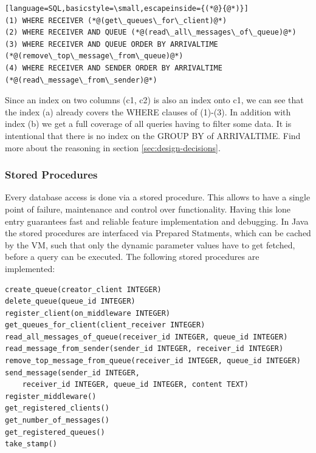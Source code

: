 \documentclass[11pt]{article}
\begin{document}
\begin{lstlisting}[language=SQL,basicstyle=\small,escapeinside={(*@}{@*)}]
(1) WHERE RECEIVER (*@(get\_queues\_for\_client)@*)
(2) WHERE RECEIVER AND QUEUE (*@(read\_all\_messages\_of\_queue)@*)
(3) WHERE RECEIVER AND QUEUE ORDER BY ARRIVALTIME (*@(remove\_top\_message\_from\_queue)@*)
(4) WHERE RECEIVER AND SENDER ORDER BY ARRIVALTIME (*@(read\_message\_from\_sender)@*)
\end{lstlisting}
Since an index on two columns (c1, c2) is also an index onto c1, we can see that the index (a) already covers the WHERE clauses of (1)-(3). In addition with index (b) we get a full coverage of all queries having to filter some data. It is intentional that there is no index on the GROUP BY of ARRIVALTIME. Find more about the reasoning in section \ref{sec:design-decisions}.

\subsubsection{Stored Procedures}\label{sec:stored-procedures}
Every database access is done via a stored procedure. This allows to have a single point of failure, maintenance and control over functionality. Having this lone entry guarantees fast and reliable feature implementation and debugging. In Java the stored procedures are interfaced via Prepared Statments, which can be cached by the VM, such that only the dynamic parameter values have to get fetched, before a query can be executed. The following stored procedures are implemented:
\begin{lstlisting}
create_queue(creator_client INTEGER)
delete_queue(queue_id INTEGER)
register_client(on_middleware INTEGER)
get_queues_for_client(client_receiver INTEGER)
read_all_messages_of_queue(receiver_id INTEGER, queue_id INTEGER)
read_message_from_sender(sender_id INTEGER, receiver_id INTEGER)
remove_top_message_from_queue(receiver_id INTEGER, queue_id INTEGER)
send_message(sender_id INTEGER,
	receiver_id INTEGER, queue_id INTEGER, content TEXT)
register_middleware()
get_registered_clients()
get_number_of_messages()
get_registered_queues()
take_stamp()
\end{lstlisting}
\end{document}

